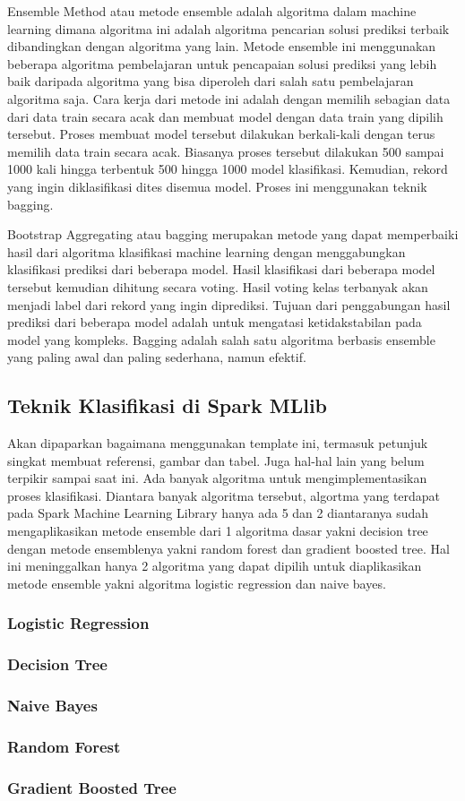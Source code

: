 Ensemble Method atau metode ensemble adalah algoritma dalam machine learning dimana algoritma ini adalah algoritma pencarian solusi prediksi terbaik dibandingkan dengan algoritma yang lain. Metode ensemble ini menggunakan beberapa algoritma pembelajaran untuk pencapaian solusi prediksi yang lebih baik daripada algoritma yang bisa diperoleh dari salah satu pembelajaran algoritma saja. Cara kerja dari metode ini adalah dengan memilih sebagian data dari data train secara acak dan membuat model dengan data train yang dipilih tersebut. Proses membuat model tersebut dilakukan berkali-kali dengan terus memilih data train secara acak. Biasanya proses tersebut dilakukan 500 sampai 1000 kali hingga terbentuk 500 hingga 1000 model klasifikasi. Kemudian, rekord yang ingin diklasifikasi dites disemua model. Proses ini menggunakan teknik bagging.

Bootstrap Aggregating atau bagging merupakan metode yang dapat memperbaiki hasil dari algoritma klasifikasi machine learning dengan menggabungkan klasifikasi prediksi dari beberapa model. Hasil klasifikasi dari beberapa model tersebut kemudian dihitung secara voting. Hasil voting kelas terbanyak akan menjadi label dari rekord yang ingin diprediksi. Tujuan dari penggabungan hasil prediksi dari beberapa model adalah untuk mengatasi ketidakstabilan pada model yang kompleks. Bagging adalah salah satu algoritma berbasis ensemble yang paling awal dan paling sederhana, namun efektif. 
 
 
\subsection{Teknik Klasifikasi di Spark MLlib}
Akan dipaparkan bagaimana menggunakan template ini, termasuk petunjuk singkat membuat referensi, gambar dan tabel.
Juga hal-hal lain yang belum terpikir sampai saat ini. 
Ada banyak algoritma untuk mengimplementasikan proses klasifikasi. Diantara banyak algoritma tersebut, algortma yang terdapat pada Spark Machine Learning Library hanya ada 5 dan 2 diantaranya sudah mengaplikasikan metode ensemble dari 1 algoritma dasar yakni decision tree dengan metode ensemblenya yakni random forest dan gradient boosted tree. Hal ini meninggalkan hanya 2 algoritma yang dapat dipilih untuk diaplikasikan metode ensemble yakni algoritma logistic regression dan naive bayes.
 
\subsubsection{Logistic Regression}
\subsubsection{Decision Tree}
\subsubsection{Naive Bayes}
\subsubsection{Random Forest}
\subsubsection{Gradient Boosted Tree}
 
